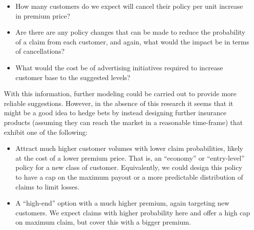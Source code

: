 \documentclass{article}
\begin{document}
\begin{itemize}
  \item How many customers do we expect will cancel their policy per
    unit increase in premium price?
  \item Are there are any policy changes that can be made to reduce
    the probability of a claim from each customer, and again, what
    would the impact be in terms of cancellations?
  \item What would the cost be of advertising initiatives required to
    increase customer base to the suggested levels?
\end{itemize}

With this information, further modeling could be carried out to
provide more reliable suggestions. However, in the absence of this
research it seems that it might be a good idea to hedge bets by
instead designing further insurance products (assuming they can reach
the market in a reasonable time-frame) that exhibit one of the following:

\begin{itemize}
  \item Attract much higher customer volumes with lower claim
    probabilities, likely at the cost of a lower premium price. That
    is, an ``economy'' or ``entry-level'' policy for a new class of
    customer. Equivalently, we could design this policy to have a cap
    on the maximum payout or a more predictable distribution of claims
    to limit losses.
  \item A ``high-end'' option with a much higher premium, again
    targeting new customers. We expect claims with higher probability
    here and offer a high cap on maximum claim, but cover this with a
    bigger premium.
\end{itemize}
\end{document}
